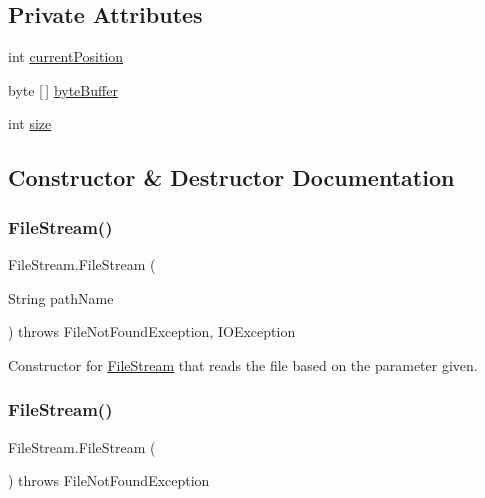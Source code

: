 \subsection*{Private Attributes}
\begin{DoxyCompactItemize}
\item 
int \hyperlink{class_file_stream_a3d1da0e929f30d4ec245b2864285ad67}{current\+Position}
\item 
byte \mbox{[}$\,$\mbox{]} \hyperlink{class_file_stream_a3fd85491eb1625e6cd8414c19ee0defa}{byte\+Buffer}
\item 
int \hyperlink{class_file_stream_a0c4c084f04036a1a234eb04bf052bc1c}{size}
\end{DoxyCompactItemize}


\subsection{Constructor \& Destructor Documentation}
\hypertarget{class_file_stream_a120b1fd6e4c74e93199d063da1c65b98}{}\label{class_file_stream_a120b1fd6e4c74e93199d063da1c65b98} 
\subsubsection{\texorpdfstring{File\+Stream()}{FileStream()}\hspace{0.1cm}{\footnotesize\ttfamily [1/2]}}
{\footnotesize\ttfamily File\+Stream.\+File\+Stream (\begin{DoxyParamCaption}\item[{String}]{path\+Name }\end{DoxyParamCaption}) throws File\+Not\+Found\+Exception, I\+O\+Exception}



Constructor for \hyperlink{class_file_stream}{File\+Stream} that reads the file based on the parameter given. 

\hypertarget{class_file_stream_aa919eed4082491d09520911563d44efd}{}\label{class_file_stream_aa919eed4082491d09520911563d44efd} 
\subsubsection{\texorpdfstring{File\+Stream()}{FileStream()}\hspace{0.1cm}{\footnotesize\ttfamily [2/2]}}
{\footnotesize\ttfamily File\+Stream.\+File\+Stream (\begin{DoxyParamCaption}{ }\end{DoxyParamCaption}) throws File\+Not\+Found\+Exception}



